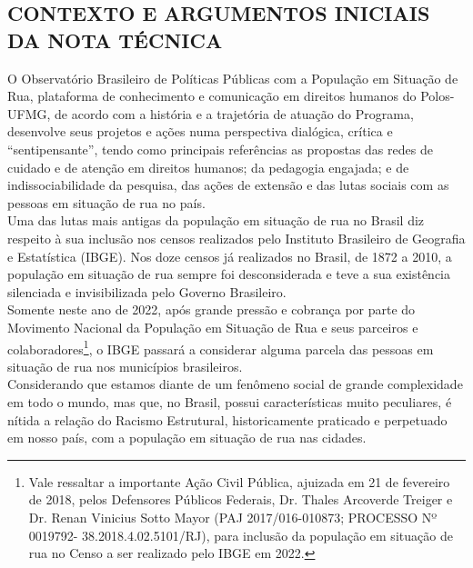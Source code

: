 \documentclass[14pt]{extarticle}
\begin{document}
\newpage



\begin{center}
\section{CONTEXTO E ARGUMENTOS INICIAIS DA NOTA TÉCNICA}
\end{center}
\label{contexto_elaboracao}
\vspace{1cm}



O Observatório Brasileiro de Políticas Públicas com a População em Situação de Rua, plataforma de conhecimento e comunicação em direitos humanos do Polos-UFMG, de acordo com a história e a trajetória de atuação do Programa, desenvolve seus projetos e ações numa perspectiva dialógica, crítica e “sentipensante”, tendo como principais referências as propostas das redes de cuidado e de atenção em direitos humanos; da pedagogia engajada; e de indissociabilidade da pesquisa, das ações de extensão e das lutas sociais com as pessoas em situação de rua no país.\\

Uma das lutas mais antigas da população em situação de rua no Brasil diz respeito à sua inclusão nos censos realizados pelo Instituto Brasileiro de Geografia e Estatística (IBGE). Nos doze censos já realizados no Brasil, de 1872 a 2010, a população em situação de rua sempre foi desconsiderada e teve a sua existência silenciada e invisibilizada pelo Governo Brasileiro.\\

Somente neste ano de 2022, após grande pressão e cobrança por parte do Movimento Nacional da População em Situação de Rua e seus parceiros e colaboradores\footnote{Vale ressaltar a importante Ação Civil Pública, ajuizada em 21 de fevereiro de 2018, pelos Defensores Públicos Federais, Dr. Thales Arcoverde Treiger e Dr. Renan Vinicius Sotto Mayor (PAJ 2017/016-010873; PROCESSO Nº 0019792- 38.2018.4.02.5101/RJ), para inclusão da população em situação de rua no Censo a ser realizado pelo IBGE em 2022.}, o IBGE passará a considerar alguma parcela das pessoas em situação de rua nos municípios brasileiros.\\

Considerando que estamos diante de um fenômeno social de grande complexidade em todo o mundo, mas que, no Brasil, possui características muito peculiares, é nítida a relação do Racismo Estrutural, historicamente praticado e perpetuado em nosso país, com a população em situação de rua nas cidades.\\
\end{document}
